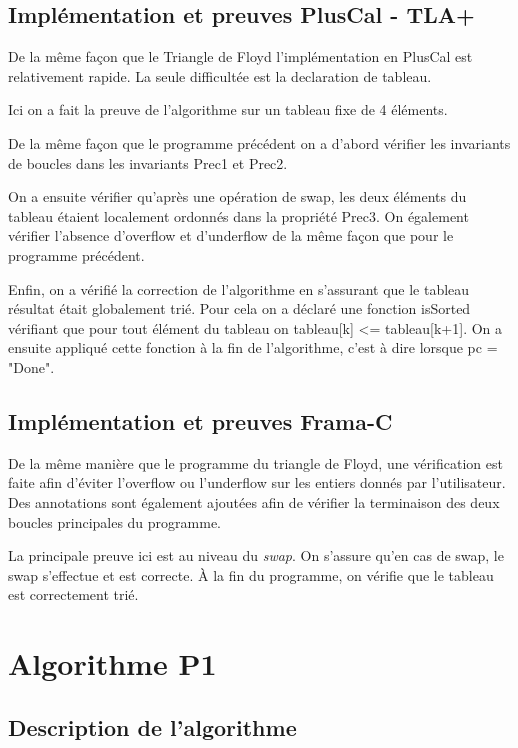 \documentclass[a4paper,11pt, oneside]{book}
\begin{document}
		\section{Implémentation et preuves PlusCal - TLA+}

		De la même façon que le Triangle de Floyd l'implémentation en PlusCal est
		relativement rapide. La seule difficultée est la declaration de tableau.

		Ici on a fait la preuve de l'algorithme sur un tableau fixe de 4 éléments.

		De la même façon que le programme précédent on a d'abord vérifier les invariants
		de boucles dans les invariants Prec1 et Prec2.

		On a ensuite vérifier qu'après une opération de swap, les deux éléments
		du tableau étaient localement ordonnés dans la propriété Prec3. On également
		vérifier l'absence d'overflow et d'underflow de la même façon que pour le programme
		précédent.

		Enfin, on a vérifié la correction de l'algorithme en s'assurant que le tableau
		résultat était globalement trié. Pour cela on a déclaré une fonction isSorted vérifiant
		que pour tout élément du tableau on tableau[k] <= tableau[k+1].
		On a ensuite appliqué cette fonction à la fin de l'algorithme, c'est à dire
		lorsque pc = "Done".


		\section{Implémentation et preuves Frama-C}

		De la même manière que le programme du triangle de Floyd, une vérification
		est faite afin d'éviter l'overflow ou l'underflow sur les entiers
		donnés par l'utilisateur. Des annotations sont également ajoutées
		afin de vérifier la terminaison des deux boucles principales du programme.

		\noindent La principale preuve ici est au niveau du \textit{swap}. On s'assure
		qu'en cas de swap, le swap s'effectue et est correcte.
		À la fin du programme, on vérifie que le tableau est correctement trié.


	\chapter{Algorithme P1}

		\section{Description de l'algorithme}
\end{document}

